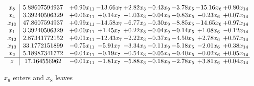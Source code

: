 \documentclass[9pt]{article}
\begin{document}
 \[\begin{array}{c| c c@{\hskip 2pt} c@{\hskip 2pt} c@{\hskip 2pt} c@{\hskip 2pt} c@{\hskip 2pt} c@{\hskip 2pt} c@{\hskip 2pt} }
 x_{8}   &  5.88607594937 & +  0.90 x_{11} & -13.66 x_{7} & +  2.82 x_{3} & +  0.43 x_{9} & -3.78 x_{5} & -15.16 x_{6} & +  0.80 x_{14}\\
 x_{4}   &  3.39240506329 & +  0.06 x_{11} & +  0.14 x_{7} & -1.03 x_{3} & -0.04 x_{9} & -0.83 x_{5} & -0.23 x_{6} & +  0.07 x_{14}\\
 x_{10}   &  47.8607594937 & +  0.99 x_{11} & -14.58 x_{7} & -6.77 x_{3} & +  0.30 x_{9} & -8.85 x_{5} & -14.65 x_{6} & +  0.97 x_{14}\\
 x_{1}   &  3.39240506329 & +  0.00 x_{11} & +  1.45 x_{7} & +  0.22 x_{3} & -0.04 x_{9} & -0.14 x_{5} & +  1.08 x_{6} & -0.12 x_{14}\\
 x_{12}   &  2.87341772152 & +  0.01 x_{11} & -12.43 x_{7} & -2.22 x_{3} & +  0.37 x_{9} & +  4.50 x_{5} & +  2.78 x_{6} & +  0.57 x_{14}\\
 x_{13}   &  33.1772151899 & -0.75 x_{11} & -5.91 x_{7} & -3.34 x_{3} & -0.11 x_{9} & -5.18 x_{5} & -2.01 x_{6} & +  0.38 x_{14}\\
 x_{2}   &  5.18987341772 & -0.04 x_{11} & -0.19 x_{7} & -0.54 x_{3} & -0.05 x_{9} & -0.40 x_{5} & -0.02 x_{6} & +  0.05 x_{14}\\
\hline
z    &  17.164556962 & -0.01 x_{11} & -1.81 x_{7} & -5.88 x_{3} & -0.18 x_{9} & -2.78 x_{5} & +  3.81 x_{6} & +  0.04 x_{14}\\
\end{array}\]


 $ x_{6} $ enters and $ x_{8} $ leaves 
\end{document}
